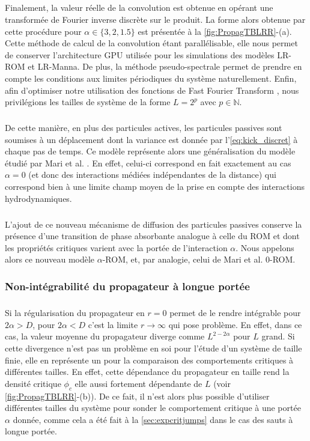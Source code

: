 \subparagraph{}Finalement, la valeur réelle de la convolution est obtenue en opérant une transformée de Fourier inverse discrète sur le produit. La forme alors obtenue par cette procédure pour $\alpha \in \{ 3, 2, 1.5 \}$ est présentée à la \autoref{fig:PropagTBLRR}-(a). Cette méthode de calcul de la convolution étant parallélisable, elle nous permet de conserver l'architecture GPU utilisée pour les simulations des modèles LR-ROM et LR-Manna. De plus, la méthode pseudo-spectrale permet de prendre en compte les conditions aux limites périodiques du système naturellement. Enfin, afin d'optimiser notre utilisation des fonctions de Fast Fourier Transform \cite{cooley_algorithm_1965}, nous privilégions les tailles de système de la forme $L = 2^p$ avec $p \in \mathbb{N}$.

\subparagraph{}De cette manière, en plus des particules actives, les particules passives sont soumises à un déplacement dont la variance est donnée par l'\autoref{eq:kick_discret} à chaque pas de temps. Ce modèle représente alors une généralisation du modèle étudié par Mari et al. \cite{mari_absorbing_2022}. En effet, celui-ci correspond en fait exactement au cas $\alpha = 0$ (et donc des interactions médiées indépendantes de la distance) qui correspond bien à une limite champ moyen de la prise en compte des interactions hydrodynamiques.

\subparagraph{}L'ajout de ce nouveau mécanisme de diffusion des particules passives conserve la présence d'une transition de phase absorbante analogue à celle du ROM et dont les propriétés critiques varient avec la portée de l'interaction $\alpha$. Nous appelons alors ce nouveau modèle $\alpha$-ROM, et, par analogie, celui de Mari et al. 0-ROM. 

\subsubsection{Non-intégrabilité du propagateur à longue portée}

\label{sec:noninteg}

\subparagraph{}Si la régularisation du propagateur en $r=0$ permet de le rendre intégrable pour $2\alpha > D$, pour $2\alpha<D$ c'est la limite $r\rightarrow\infty$ qui pose problème. En effet, dans ce cas, la valeur moyenne du propagateur diverge comme $L^{2-2\alpha}$ pour $L$ grand. Si cette divergence n'est pas un problème en soi pour l'étude d'un système de taille finie, elle en représente un pour la comparaison des comportements critiques à différentes tailles. En effet, cette dépendance du propagateur en taille rend la densité critique $\phi_c$ elle aussi fortement dépendante de $L$ (voir \autoref{fig:PropagTBLRR}-(b)). De ce fait, il n'est alors plus possible d'utiliser différentes tailles du système pour sonder le comportement critique à une portée $\alpha$ donnée, comme cela a été fait à la \autoref{sec:expcritjumps} dans le cas des sauts à longue portée.

